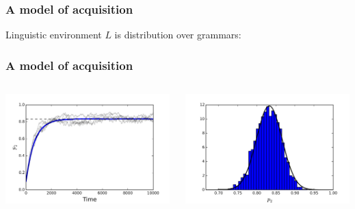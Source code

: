 \documentclass[compress]{beamer}
\begin{document}
 \begin{frame}
 \frametitle{A model of acquisition}
 Linguistic environment $L$ is distribution over grammars:
     \begin{center}
     \end{center}
     	\vfill\hfill \parencite{yang2000internal}
 \end{frame}


\begin{frame}
\frametitle{A model of acquisition}
\begin{columns}[T] 
   \begin{column}{.5\textwidth}
   \begin{center}
	 \includegraphics[width=2.5in]{lrp-learning.png}
   \end{center}
   \end{column}
   \begin{column}{.5\textwidth}
   \begin{center}
	\includegraphics[width=2.5in]{lrp-dist.png}
    \end{center}
    \end{column}
  \end{columns}  
	\vfill \hfill \citep{narendra1989}
\end{frame}
\end{document}
